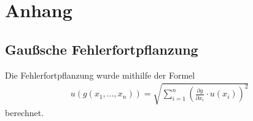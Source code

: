 \documentclass[11pt, a4paper]{article}
\begin{document}
    \section{Anhang}
    \subsection{Gaußsche Fehlerfortpflanzung}
    Die Fehlerfortpflanzung wurde mithilfe der Formel
    \begin{align}
        u\left(g \left(x_1, ..., x_n\right)\right) = \sqrt{\sum_{i=1}^n \left( \frac{\partial g }{\partial x_i} \cdot u\left(x_i\right) \right)^2} \label{gauss}
    \end{align}
    berechnet.

    
    
\end{document}
